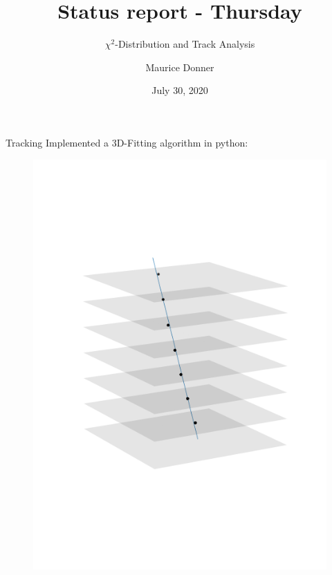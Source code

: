 \documentclass{beamer}
\title{\texorpdfstring{\color{blue!50!black}\textbf{Status report - Thursday}}{}}
\subtitle{ \texorpdfstring{$\chi^{2}$}{Lg}-Distribution and Track Analysis}
\author{Maurice Donner}
\date{July 30, 2020}
\begin{document}
\maketitle

\begin{frame}[fragile]{Tracking}
    Implemented a 3D-Fitting algorithm in python:\\
    \begin{minipage}{.32\textwidth}
	\begin{figure}[H]
	    \centering
	    \includegraphics[trim=0 80 0 80,clip,width=\textwidth]{example_1459.png}
	\end{figure}
    \end{minipage}
    \begin{minipage}{.32\textwidth}
	\begin{figure}[H]
	    \centering

\end{figure}
\end{minipage}
\end{frame}
\end{document}
